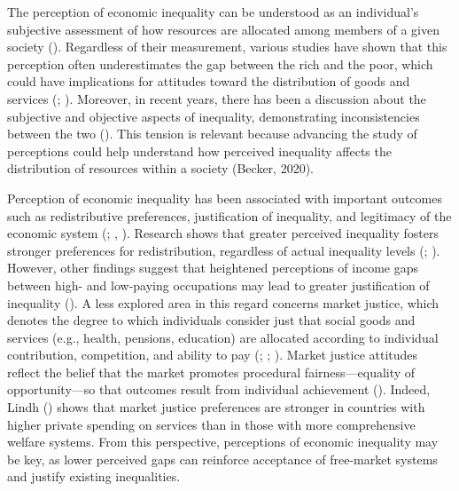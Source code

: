\documentclass[
  12pt,
]{article}
\begin{document}
The perception of economic inequality can be understood as an
individual's subjective assessment of how resources are allocated among
members of a given society (). Regardless of their measurement, various studies have shown that
this perception often underestimates the gap between the rich and the
poor, which could have implications for attitudes toward the
distribution of goods and services
(;
). Moreover, in
recent years, there has been a discussion about the subjective and
objective aspects of inequality, demonstrating inconsistencies between
the two (). This tension is
relevant because advancing the study of perceptions could help
understand how perceived inequality affects the distribution of
resources within a society (Becker, 2020).

Perception of economic inequality has been associated with important
outcomes such as redistributive preferences, justification of
inequality, and legitimacy of the economic system
(;
, ). Research
shows that greater perceived inequality fosters stronger preferences for
redistribution, regardless of actual inequality levels
(; ). However, other findings suggest that heightened
perceptions of income gaps between high- and low-paying occupations may
lead to greater justification of inequality
(). A less explored area in
this regard concerns market justice, which denotes the degree to which
individuals consider just that social goods and services (e.g., health,
pensions, education) are allocated according to individual contribution,
competition, and ability to pay
(;
;
). Market justice attitudes
reflect the belief that the market promotes procedural
fairness---equality of opportunity---so that outcomes result from
individual achievement ().
Indeed, Lindh () shows that market
justice preferences are stronger in countries with higher private
spending on services than in those with more comprehensive welfare
systems. From this perspective, perceptions of economic inequality may
be key, as lower perceived gaps can reinforce acceptance of free-market
systems and justify existing inequalities.
\end{document}
